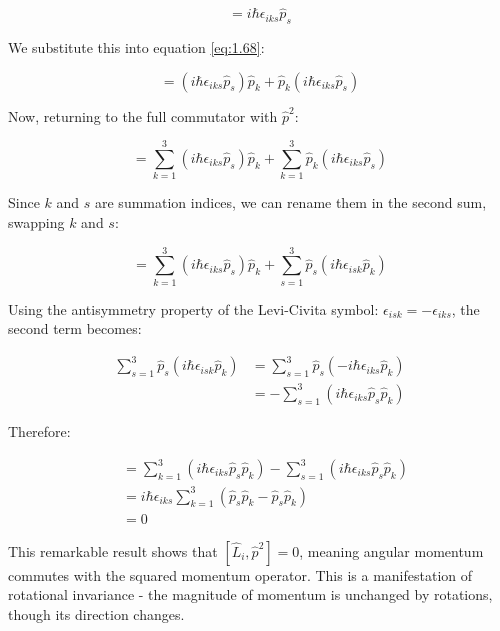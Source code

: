 \documentclass[italian]{HKNdocument}
\begin{document}
\begin{equation}
[\hat{L}_i, \hat{p}_k] = i\hbar\epsilon_{iks}\hat{p}_s \label{eq:1.69}
\end{equation}

We substitute this into equation \eqref{eq:1.68}:

\begin{equation}
[\hat{L}_i, \hat{p}_k^2] = (i\hbar\epsilon_{iks}\hat{p}_s)\hat{p}_k + \hat{p}_k(i\hbar\epsilon_{iks}\hat{p}_s) \label{eq:1.70}
\end{equation}

Now, returning to the full commutator with $\hat{p}^2$:

\begin{equation}
[\hat{L}_i, \hat{p}^2] = \sum_{k=1}^{3}(i\hbar\epsilon_{iks}\hat{p}_s)\hat{p}_k + \sum_{k=1}^{3}\hat{p}_k(i\hbar\epsilon_{iks}\hat{p}_s) \label{eq:1.71}
\end{equation}

Since $k$ and $s$ are summation indices, we can rename them in the second sum, swapping $k$ and $s$:

\begin{equation}
[\hat{L}_i, \hat{p}^2] = \sum_{k=1}^{3}(i\hbar\epsilon_{iks}\hat{p}_s)\hat{p}_k + \sum_{s=1}^{3}\hat{p}_s(i\hbar\epsilon_{isk}\hat{p}_k) \label{eq:1.72}
\end{equation}

Using the antisymmetry property of the Levi-Civita symbol: $\epsilon_{isk} = -\epsilon_{iks}$, the second term becomes:

\begin{align}
\sum_{s=1}^{3}\hat{p}_s(i\hbar\epsilon_{isk}\hat{p}_k) &= \sum_{s=1}^{3}\hat{p}_s(-i\hbar\epsilon_{iks}\hat{p}_k) \\
&= -\sum_{s=1}^{3}(i\hbar\epsilon_{iks}\hat{p}_s\hat{p}_k)
\end{align}

Therefore:

\begin{align}
[\hat{L}_i, \hat{p}^2] &= \sum_{k=1}^{3}(i\hbar\epsilon_{iks}\hat{p}_s\hat{p}_k) - \sum_{s=1}^{3}(i\hbar\epsilon_{iks}\hat{p}_s\hat{p}_k) \\
&= i\hbar\epsilon_{iks}\sum_{k=1}^{3}(\hat{p}_s\hat{p}_k - \hat{p}_s\hat{p}_k) \\
&= 0
\end{align}

This remarkable result shows that $[\hat{L}_i, \hat{p}^2] = 0$, meaning angular momentum commutes with the squared momentum operator. This is a manifestation of rotational invariance - the magnitude of momentum is unchanged by rotations, though its direction changes.
\end{document}
